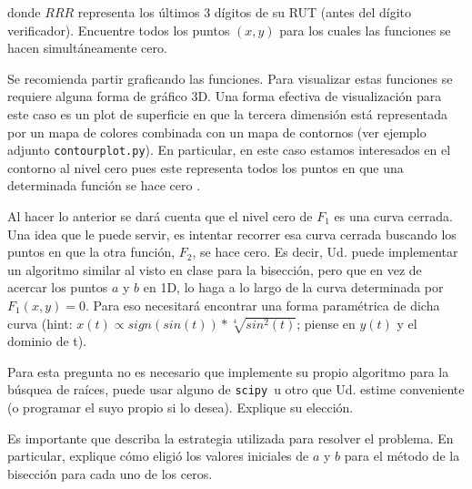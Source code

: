 \documentclass[letter, 11pt]{article}
\newcommand{\scipy}{\texttt{scipy}}
\begin{document}
\noindent donde $RRR$ representa los últimos 3 dígitos de su RUT (antes del
dígito verificador). Encuentre todos los puntos $(x, y)$ para los cuales las
funciones se hacen simultáneamente cero.

\begin{ayuda}
  \small

  Se recomienda partir graficando las funciones. Para visualizar estas
  funciones se requiere alguna forma de gráfico 3D. Una forma efectiva de
  visualización para este caso es un plot de superficie en que la tercera
  dimensión está representada por un mapa de colores combinada con un mapa de
  contornos (ver ejemplo adjunto \texttt{contourplot.py}). En particular, en
  este caso estamos interesados en el contorno al nivel cero pues este
  representa todos los puntos en que una determinada función se hace cero .

  Al hacer lo anterior se dará cuenta que el nivel cero de $F_1$ es una curva
  cerrada. Una idea que le puede servir, es intentar recorrer esa curva cerrada
  buscando los puntos en que la otra función, $F_2$, se hace cero. Es decir,
  Ud.  puede implementar un algoritmo similar al visto en clase para la
  bisección, pero que en vez de acercar los puntos $a$ y $b$ en 1D, lo haga a
  lo largo de la curva determinada por $F_1(x, y)=0$. Para eso necesitará
  encontrar una forma paramétrica de dicha curva (hint: $x(t) \propto
  sign(sin(t)) * \sqrt[4]{sin^2(t)}$; piense en $y(t)$ y el dominio de t).

\end{ayuda}

Para esta pregunta no es necesario que implemente su propio algoritmo para la
búsquea de raíces, puede usar alguno de \scipy~u otro que Ud. estime
conveniente (o programar el suyo propio si lo desea). Explique su elección.

Es importante que describa la estrategia utilizada para resolver el problema.
En particular, explique cómo eligió los valores iniciales de $a$ y $b$ para el
método de la bisección para cada uno de los ceros.

\end{document}
